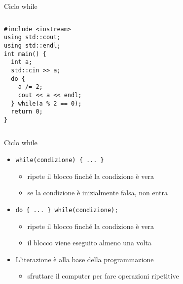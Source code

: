 \documentclass[xcolor=dvipsnames,handout]{beamer}
\begin{document}
\begin{frame}[fragile]{Ciclo while}
  \vfill
  \begin{columns}[c]
    \vfill
    \begin{lstlisting}
#include <iostream>
using std::cout;
using std::endl;
int main() {
  int a;
  std::cin >> a;
  do {
    a /= 2;
    cout << a << endl;
  } while(a % 2 == 0);
  return 0;
}
    \end{lstlisting}
    \vfill
    \vfill
    \begin{center}\end{center}
    \vfill
  \end{columns}
  \vfill
\end{frame}

\begin{frame}[fragile]{Ciclo while}
  \vfill
  \begin{itemize}
    \item \lstinline$while(condizione) { ... }$
    \begin{itemize}
      \item ripete il blocco finché la condizione è vera
      \item se la condizione è inizialmente falsa, non entra
    \end{itemize}
    \vfill
    \item \lstinline$do { ... } while(condizione);$
    \begin{itemize}
      \item ripete il blocco finché la condizione è vera
      \item il blocco viene eseguito \alert{almeno} una volta
    \end{itemize}
    \vfill
    \item L'\alert{iterazione} è alla base della programmazione
    \begin{itemize}
      \item sfruttare il computer per fare operazioni ripetitive
    \end{itemize}
  \end{itemize}
  \vfill
\end{frame}
\end{document}

